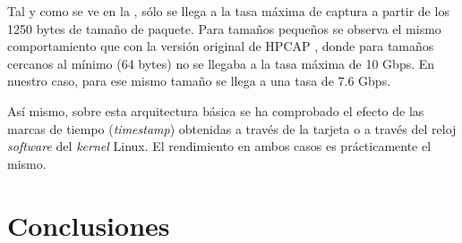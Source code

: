 \documentclass[oneside, draft]{epstfg}
\begin{document}
Tal y como se ve en la , sólo se llega a la tasa máxima de captura a partir de los 1250 bytes de tamaño de paquete. Para tamaños pequeños se observa el mismo comportamiento que con la versión original de HPCAP \citep{MorenoTFM2012}, donde para tamaños cercanos al mínimo (64 bytes) no se llegaba a la tasa máxima de 10 Gbps. En nuestro caso, para ese mismo tamaño se llega a una tasa de 7.6 Gbps.

Así mismo, sobre esta arquitectura básica se ha comprobado el efecto de las marcas de tiempo (\textit{timestamp}) obtenidas a través de la tarjeta o a través del reloj \textit{software} del \textit{kernel} Linux. El rendimiento en ambos casos es prácticamente el mismo.


\chapter{Conclusiones}

\appendix

\printnoidxglossaries
\cleardoublepage

\nocite{*}
{}

\cleardoublepage
\printindex
\end{document}
